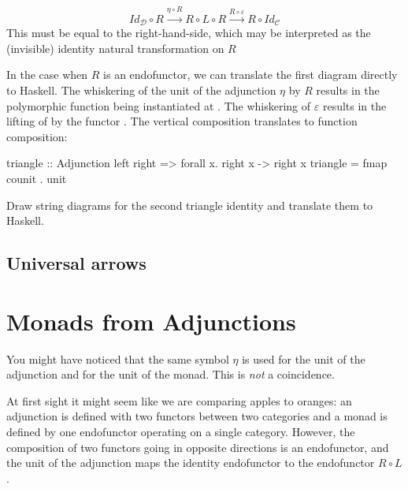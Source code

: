 \documentclass[DaoFP]{subfiles}
\begin{document}
\[  Id_{\mathcal{D}} \circ R \xrightarrow{\eta \circ R} R \circ L \circ R \xrightarrow{R \circ \varepsilon} R \circ Id_{\mathcal{C}}  \]
This must be equal to the right-hand-side, which may be interpreted as the (invisible) identity natural transformation on $R$

In the case when $R$ is an endofunctor, we can translate the first diagram directly to Haskell. The whiskering of the unit of the adjunction $\eta$ by $R$ results in the polymorphic function  being instantiated at . The whiskering of $\varepsilon$ results in the lifting of  by the functor . The vertical composition translates to function composition:
\begin{haskell}
triangle :: Adjunction left right => forall x. right x -> right x
triangle = fmap counit . unit
\end{haskell}

\begin{exercise}
Draw string diagrams for the second triangle identity and translate them to Haskell.
\end{exercise}

\subsection{Universal arrows}



\section{Monads from Adjunctions}

You might have noticed that the same symbol $\eta$ is used for the unit of the adjunction and for the unit of the monad. This is \emph{not} a coincidence. 

At first sight it might seem like we are comparing apples to oranges: an adjunction is defined with two functors between two categories and a monad is defined by one endofunctor operating on a single category. However, the composition of two functors going in opposite directions is an endofunctor, and the unit of the adjunction maps the identity endofunctor to the endofunctor $R \circ L$. 
\end{document}
